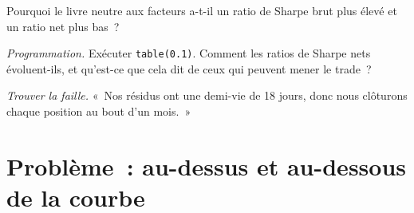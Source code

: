 \begin{exercise}[$\star\star$]\label{exo:s2:government-bond-relative-value:6}
Pourquoi le livre neutre aux facteurs a-t-il un ratio de Sharpe brut plus élevé et un ratio net plus bas~?
\end{exercise}

\begin{exercise}[$\star\star\star$]\label{exo:s2:government-bond-relative-value:7}
\emph{Programmation.} Exécuter \texttt{table(0.1)}. Comment les ratios de Sharpe nets évoluent-ils, et qu'est-ce que cela dit de ceux qui peuvent mener le trade~?
\end{exercise}

\begin{exercise}[$\star\star\star$]\label{exo:s2:government-bond-relative-value:8}
\emph{Trouver la faille.} «~Nos résidus ont une demi-vie de 18 jours, donc nous clôturons chaque position au bout d'un mois.~»
\end{exercise}

\section{Problème~: au-dessus et au-dessous de la courbe}

